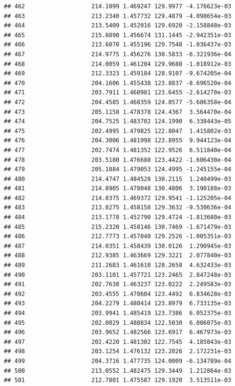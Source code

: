 \documentclass[
]{article}
\begin{document}
\begin{verbatim}
## 462                   214.1099 1.469247 129.9977 -4.176623e-03
## 463                   213.2340 1.457732 129.4879 -4.098654e-03
## 464                   213.5409 1.452016 129.6920 -2.158848e-03
## 465                   215.8890 1.456674 131.1445 -2.942351e-03
## 466                   213.6070 1.455196 129.7548 -1.036437e-03
## 467                   214.9775 1.456276 130.5833 -6.321936e-04
## 468                   214.0059 1.461204 129.9688 -1.018912e-03
## 469                   212.3323 1.459184 128.9107 -9.674205e-04
## 470                   204.1606 1.455438 123.8837 -8.696520e-04
## 471                   203.7911 1.460981 123.6455 -2.614270e-03
## 472                   204.4585 1.468359 124.0577 -5.686358e-04
## 473                   205.1158 1.478378 124.4367  3.564470e-04
## 474                   204.7525 1.483702 124.1990  6.338443e-05
## 475                   202.4995 1.479825 122.8047  1.415802e-03
## 476                   204.3006 1.481998 123.8955  9.944123e-04
## 477                   202.7474 1.481352 122.9526  6.511840e-04
## 478                   203.5180 1.476688 123.4422 -1.606430e-04
## 479                   205.1884 1.479053 124.4995 -1.245155e-04
## 480                   214.4747 1.484528 130.2115  1.240499e-03
## 481                   214.8905 1.478048 130.4806  3.190188e-03
## 482                   214.0375 1.469372 129.9541 -1.125205e-04
## 483                   213.0275 1.458158 129.3632 -9.530636e-04
## 484                   213.1778 1.452790 129.4724 -1.813680e-03
## 485                   215.2320 1.458146 130.7469 -1.671479e-03
## 486                   212.7773 1.457040 129.2526 -1.005351e-03
## 487                   214.0351 1.458439 130.0126  1.290945e-03
## 488                   212.9385 1.463669 129.3221  2.077840e-03
## 489                   211.2683 1.461610 128.2658  4.632433e-03
## 490                   203.1101 1.457721 123.2465  2.847248e-03
## 491                   202.7638 1.463237 123.0222  2.249583e-03
## 492                   203.4555 1.470604 123.4492  6.834628e-03
## 493                   204.2279 1.480414 123.8979  6.733135e-03
## 494                   203.9941 1.485419 123.7386  6.052375e-03
## 495                   202.0029 1.480834 122.5030  6.006075e-03
## 496                   203.9652 1.482566 123.6917  6.467973e-03
## 497                   202.4220 1.481302 122.7545  4.185043e-03
## 498                   203.1254 1.476132 123.2026  2.172231e-03
## 499                   204.3716 1.477735 124.0009 -6.134789e-04
## 500                   213.0552 1.482475 129.3449  1.212864e-03
## 501                   212.7801 1.475587 129.1920  3.513511e-03

\end{verbatim}
\end{document}
